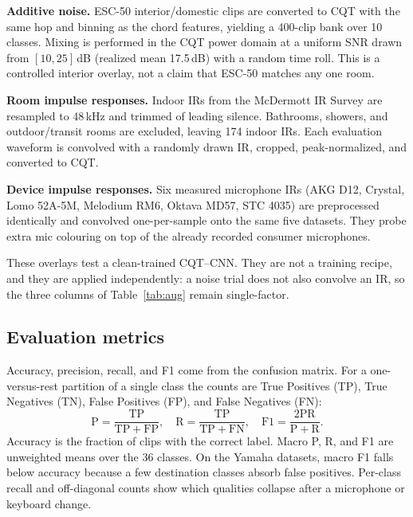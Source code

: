 \documentclass[pdflatex,sn-mathphys-num,iicol]{sn-jnl}
\theoremstyle{thmstyleone}
\theoremstyle{thmstyletwo}
\theoremstyle{thmstylethree}
\begin{document}
\textbf{Additive noise.} ESC-50 interior/domestic clips \cite{Piczak2015} are converted to CQT with the same hop and binning as the chord features, yielding a 400-clip bank over 10 classes. Mixing is performed in the CQT power domain at a uniform SNR drawn from $[10, 25]$\,dB (realized mean 17.5\,dB) with a random time roll. This is a controlled interior overlay, not a claim that ESC-50 matches any one room.

\textbf{Room impulse responses.} Indoor IRs from the McDermott IR Survey \cite{Traer2016} are resampled to 48\,kHz and trimmed of leading silence. Bathrooms, showers, and outdoor/transit rooms are excluded, leaving 174 indoor IRs. Each evaluation waveform is convolved with a randomly drawn IR, cropped, peak-normalized, and converted to CQT.

\textbf{Device impulse responses.} Six measured microphone IRs (AKG D12, Crystal, Lomo 52A-5M, Melodium RM6, Oktava MD57, STC 4035) are preprocessed identically and convolved one-per-sample onto the same five datasets. They probe extra mic colouring on top of the already recorded consumer microphones.

These overlays test a clean-trained CQT--CNN. They are not a training recipe, and they are applied independently: a noise trial does not also convolve an IR, so the three columns of Table~\ref{tab:aug} remain single-factor.

\subsection{Evaluation metrics}\label{subsec3_6}

Accuracy, precision, recall, and F1 come from the confusion matrix. For a one-versus-rest partition of a single class the counts are True Positives (TP), True Negatives (TN), False Positives (FP), and False Negatives (FN):
\begin{equation}
\mathrm{P}=\frac{\mathrm{TP}}{\mathrm{TP}+\mathrm{FP}},\quad
\mathrm{R}=\frac{\mathrm{TP}}{\mathrm{TP}+\mathrm{FN}},\quad
\mathrm{F1}=\frac{2\mathrm{PR}}{\mathrm{P}+\mathrm{R}}.
\label{eq:prf}
\end{equation}
Accuracy is the fraction of clips with the correct label. Macro P, R, and F1 are unweighted means over the 36 classes. On the Yamaha datasets, macro F1 falls below accuracy because a few destination classes absorb false positives. Per-class recall and off-diagonal counts show which qualities collapse after a microphone or keyboard change.
\end{document}
